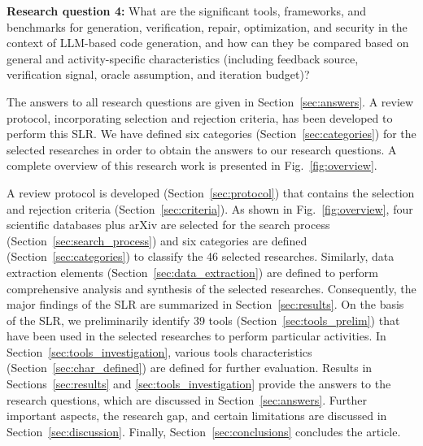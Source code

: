 \documentclass[10pt,a4paper]{article}
\begin{document}
\textbf{Research question 4:} What are the significant tools, frameworks, and benchmarks for generation, verification, repair, optimization, and security in the context of LLM-based code generation, and how can they be compared based on general and activity-specific characteristics (including feedback source, verification signal, oracle assumption, and iteration budget)?

The answers to all research questions are given in Section~\ref{sec:answers}. A review protocol, incorporating selection and rejection criteria, has been developed to perform this SLR. We have defined six categories (Section~\ref{sec:categories}) for the selected researches in order to obtain the answers to our research questions. A complete overview of this research work is presented in Fig.~\ref{fig:overview}.

A review protocol is developed (Section~\ref{sec:protocol}) that contains the selection and rejection criteria (Section~\ref{sec:criteria}). As shown in Fig.~\ref{fig:overview}, four scientific databases plus arXiv are selected for the search process (Section~\ref{sec:search_process}) and six categories are defined (Section~\ref{sec:categories}) to classify the 46 selected researches. Similarly, data extraction elements (Section~\ref{sec:data_extraction}) are defined to perform comprehensive analysis and synthesis of the selected researches. Consequently, the major findings of the SLR are summarized in Section~\ref{sec:results}. On the basis of the SLR, we preliminarily identify 39 tools (Section~\ref{sec:tools_prelim}) that have been used in the selected researches to perform particular activities. In Section~\ref{sec:tools_investigation}, various tools characteristics (Section~\ref{sec:char_defined}) are defined for further evaluation. Results in Sections~\ref{sec:results} and \ref{sec:tools_investigation} provide the answers to the research questions, which are discussed in Section~\ref{sec:answers}. Further important aspects, the research gap, and certain limitations are discussed in Section~\ref{sec:discussion}. Finally, Section~\ref{sec:conclusions} concludes the article.
\end{document}
